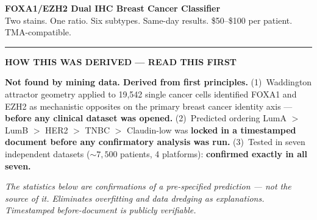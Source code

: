\documentclass[9pt, a4paper]{article}
\begin{document}
\thispagestyle{fancy}

\begin{center}
{\large\bfseries\color{headerblue}
FOXA1/EZH2 Dual IHC Breast Cancer Classifier}\\[0.15em]
{\small Two stains. One ratio. Six subtypes.
Same-day results. \$50--\$100 per patient.
TMA-compatible.}
\end{center}

\vspace{0.15em}
\noindent\rule{\textwidth}{1.2pt}
\vspace{0.1em}

\begin{mdframed}[backgroundcolor=derivebox,
                 linecolor=blue!50!black,
                 linewidth=0.8pt,
                 innertopmargin=3pt,
                 innerbottommargin=3pt,
                 innerleftmargin=6pt,
                 innerrightmargin=6pt,
                 skipabove=0pt,
                 skipbelow=0pt]
{\small\textbf{\color{headerblue}HOW THIS WAS
DERIVED --- READ THIS FIRST}}

\smallskip
{\small
\textbf{Not found by mining data. Derived from
first principles.}
(1)~Waddington attractor geometry applied to
19,542 single cancer cells identified FOXA1 and
EZH2 as mechanistic opposites on the primary
breast cancer identity axis ---
\textbf{before any clinical dataset was opened.}
(2)~Predicted ordering LumA $>$ LumB $>$ HER2
$>$ TNBC $>$ Claudin-low was
\textbf{locked in a timestamped document before
any confirmatory analysis was run.}
(3)~Tested in seven independent datasets
(${\sim}7{,}500$ patients, 4 platforms):
\textbf{confirmed exactly in all seven.}

\smallskip
\textit{The statistics below are confirmations
of a pre-specified prediction --- not the source
of it. Eliminates overfitting and data dredging
as explanations. Timestamped before-document is
publicly verifiable.}}
\end{mdframed}

\vspace{0.2em}
\end{document}
